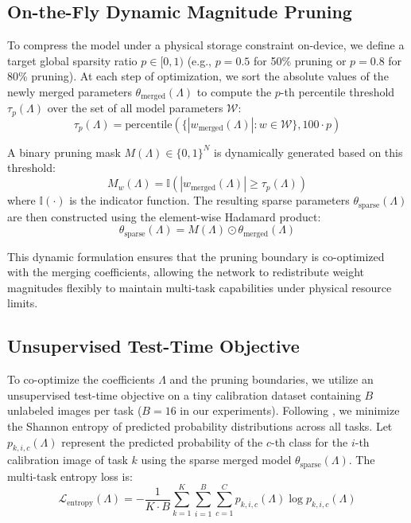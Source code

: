 \subsection{On-the-Fly Dynamic Magnitude Pruning}

To compress the model under a physical storage constraint on-device, we define a target global sparsity ratio $p \in [0, 1)$ (e.g., $p=0.5$ for 50\% pruning or $p=0.8$ for 80\% pruning). At each step of optimization, we sort the absolute values of the newly merged parameters $\theta_{\text{merged}}(\Lambda)$ to compute the $p$-th percentile threshold $\tau_p(\Lambda)$ over the set of all model parameters $\mathcal{W}$:
\begin{equation}
    \tau_p(\Lambda) = \text{percentile}\left( \{ |w_{\text{merged}}(\Lambda)| : w \in \mathcal{W} \}, 100 \cdot p \right)
\end{equation}

A binary pruning mask $M(\Lambda) \in \{0, 1\}^N$ is dynamically generated based on this threshold:
\begin{equation}
    M_w(\Lambda) = \mathbb{I}(|w_{\text{merged}}(\Lambda)| \ge \tau_p(\Lambda))
\end{equation}
where $\mathbb{I}(\cdot)$ is the indicator function. The resulting sparse parameters $\theta_{\text{sparse}}(\Lambda)$ are then constructed using the element-wise Hadamard product:
\begin{equation}
    \theta_{\text{sparse}}(\Lambda) = M(\Lambda) \odot \theta_{\text{merged}}(\Lambda)
\end{equation}

This dynamic formulation ensures that the pruning boundary is co-optimized with the merging coefficients, allowing the network to redistribute weight magnitudes flexibly to maintain multi-task capabilities under physical resource limits.

\subsection{Unsupervised Test-Time Objective}

To co-optimize the coefficients $\Lambda$ and the pruning boundaries, we utilize an unsupervised test-time objective on a tiny calibration dataset containing $B$ unlabeled images per task ($B=16$ in our experiments). Following \cite{wang2020tent,yang2024adamerging}, we minimize the Shannon entropy of predicted probability distributions across all tasks. Let $p_{k, i, c}(\Lambda)$ represent the predicted probability of the $c$-th class for the $i$-th calibration image of task $k$ using the sparse merged model $\theta_{\text{sparse}}(\Lambda)$. The multi-task entropy loss is:
\begin{equation}
    \label{eq:entropy_loss}
    \mathcal{L}_{\text{entropy}}(\Lambda) = -\frac{1}{K \cdot B} \sum_{k=1}^K \sum_{i=1}^B \sum_{c=1}^C p_{k,i,c}(\Lambda) \log p_{k,i,c}(\Lambda)
\end{equation}

